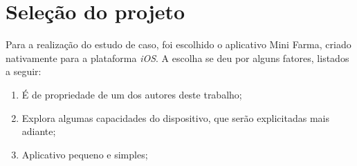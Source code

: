 \section{Seleção do projeto} \label{sec:selecaodoprojeto}

Para a realização do estudo de caso, foi escolhido o aplicativo Mini Farma, criado nativamente para a plataforma \textit{iOS}. A escolha se deu por alguns fatores, listados a seguir:

\begin{enumerate}
    \item É de propriedade de um dos autores deste trabalho;
    \item Explora algumas capacidades do dispositivo, que serão explicitadas mais adiante;
    \item Aplicativo pequeno e simples;
\end{enumerate}
 
